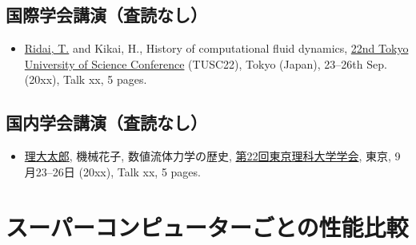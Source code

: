 \section*{国際学会講演（査読なし）}
\label{sec:app_kokusai}
\begin{itemize}
    \item \underline{Ridai, T.} and Kikai, H., History of computational fluid dynamics, \href{https://xxxxxx}{22nd Tokyo University of Science Conference} (TUSC22), Tokyo (Japan), 23--26th Sep. (20xx), Talk xx, 5 pages.
\end{itemize}

\section*{国内学会講演（査読なし）}
\label{sec:app_kokunai}
\begin{itemize}
    \item \underline{理大太郎}, 機械花子, 数値流体力学の歴史, \href{https://xxxxxx}{第22回東京理科大学学会}, 東京, 9月23--26日 (20xx), Talk xx, 5 pages.
\end{itemize}


\chapter{スーパーコンピューターごとの性能比較}
\label{ch:app_sx}

\lipsum[1-2]

